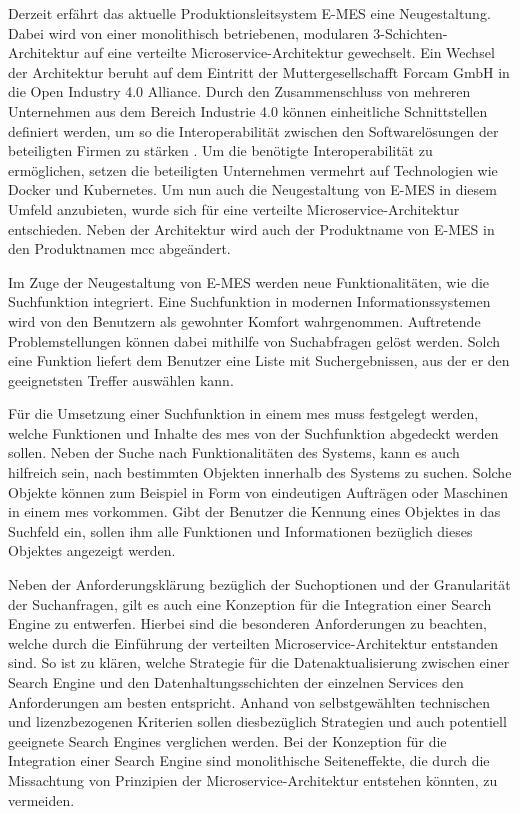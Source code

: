 Derzeit erfährt das aktuelle Produktionsleitsystem E-MES eine Neugestaltung. Dabei wird von einer monolithisch betriebenen, modularen 3-Schichten-Architektur auf eine verteilte Microservice-Architektur gewechselt. Ein Wechsel der Architektur beruht auf dem Eintritt der Muttergesellschafft Forcam GmbH in die \glqq Open Industry 4.0 Alliance\grqq{}. Durch den Zusammenschluss von mehreren Unternehmen aus dem Bereich \glqq Industrie 4.0\grqq{} können einheitliche Schnittstellen definiert werden, um so die Interoperabilität zwischen den Softwarelösungen der beteiligten Firmen zu stärken \cite{OpenIndustry4.0Alliance.2021}. Um die benötigte Interoperabilität zu ermöglichen, setzen die beteiligten Unternehmen vermehrt auf Technologien wie Docker und Kubernetes. Um nun auch die Neugestaltung von E-MES in diesem Umfeld anzubieten, wurde sich für eine verteilte Microservice-Architektur entschieden. Neben der Architektur wird auch der Produktname von \glqq E-MES\grqq{} in den Produktnamen \glqq \gls{mcc}\grqq{} abgeändert.

Im Zuge der Neugestaltung von E-MES werden neue Funktionalitäten, wie die Suchfunktion integriert. Eine Suchfunktion in modernen Informationssystemen wird von den Benutzern als gewohnter Komfort wahrgenommen. Auftretende Problemstellungen können dabei mithilfe von Suchabfragen gelöst werden. Solch eine Funktion liefert dem Benutzer eine Liste mit Suchergebnissen, aus der er den geeignetsten Treffer auswählen kann.

Für die Umsetzung einer Suchfunktion in einem \gls{mes} muss festgelegt werden, welche Funktionen und Inhalte des \gls{mes} von der Suchfunktion abgedeckt werden sollen. Neben der Suche nach Funktionalitäten des Systems, kann es auch hilfreich sein, nach bestimmten \glqq Objekten\grqq{} innerhalb des Systems zu suchen. Solche Objekte können zum Beispiel in Form von eindeutigen Aufträgen oder Maschinen in einem \gls{mes} vorkommen. Gibt der Benutzer die Kennung eines Objektes in das Suchfeld ein, sollen ihm alle Funktionen und Informationen bezüglich dieses Objektes angezeigt werden.

Neben der Anforderungsklärung bezüglich der Suchoptionen und der Granularität der Suchanfragen, gilt es auch eine Konzeption für die Integration einer Search Engine zu entwerfen. Hierbei sind die besonderen Anforderungen zu beachten, welche durch die Einführung der verteilten Microservice-Architektur entstanden sind. So ist zu klären, welche Strategie für die Datenaktualisierung zwischen einer Search Engine und den Datenhaltungsschichten der einzelnen Services den Anforderungen am besten entspricht. Anhand von selbstgewählten technischen und lizenzbezogenen Kriterien sollen diesbezüglich Strategien und auch potentiell geeignete Search Engines verglichen werden. Bei der Konzeption für die Integration einer Search Engine sind monolithische Seiteneffekte, die durch die Missachtung von Prinzipien der Microservice-Architektur entstehen könnten, zu vermeiden.

